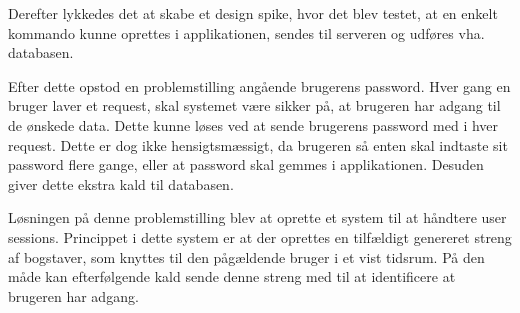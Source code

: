 Derefter lykkedes det at skabe et design spike, hvor det blev testet, at en enkelt kommando kunne oprettes i applikationen, sendes til serveren og udføres vha. databasen. 

Efter dette opstod en problemstilling angående brugerens password. Hver gang en bruger laver et request, skal systemet være sikker på, at brugeren har adgang til de ønskede data. Dette kunne løses ved at sende brugerens password med i hver request. Dette er dog ikke hensigtsmæssigt, da brugeren så enten skal indtaste sit password flere gange, eller at password skal gemmes i applikationen. Desuden giver dette ekstra kald til databasen. 

Løsningen på denne problemstilling blev at oprette et system til at håndtere user sessions. Princippet i dette system er at der oprettes en tilfældigt genereret streng af bogstaver, som knyttes til den pågældende bruger i et vist tidsrum. På den måde kan efterfølgende kald sende denne streng med til at identificere at brugeren har adgang. 
